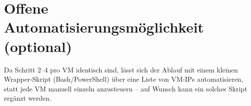 \documentclass[11pt,a4paper]{article}
\begin{document}
\section{Offene Automatisierungsm\"oglichkeit (optional)}

Da Schritt 2--4 pro VM identisch sind, l\"asst sich der Ablauf mit einem kleinen
Wrapper-Skript (Bash/PowerShell) \"uber eine Liste von VM-IPs automatisieren, statt
jede VM manuell einzeln anzusteuern -- auf Wunsch kann ein solches Skript erg\"anzt
werden.
\end{document}
